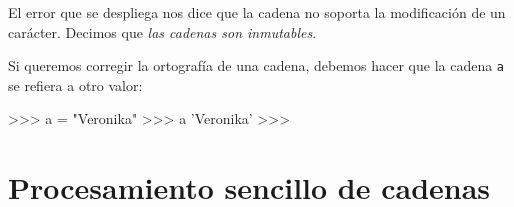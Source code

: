 El error que se despliega nos dice que la cadena no soporta
la modificación de un carácter. Decimos que {\it las cadenas
son inmutables}.

Si queremos corregir la ortografía de una cadena, debemos hacer
que la cadena \lstinline!a! se refiera a otro valor:

\begin{codigo-python-sn}
>>> a = "Veronika"
>>> a
'Veronika'
>>>
\end{codigo-python-sn}

\section{Procesamiento sencillo de cadenas}


